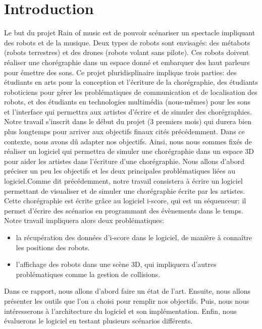 \section{Introduction}

Le but du projet Rain of music est de pouvoir scénariser un spectacle impliquant des robots et de la musique. Deux types de robots sont envisagés: des métabots (robots terrestres) et des drones (robots volant sans pilote). Ces robots doivent réaliser une chorégraphie dans un espace donné et embarquer des haut parleurs pour émettre des sons. Ce projet pluridisplinaire implique trois parties: des étudiants en arts pour la conception et l'écriture de la chorégraphie, des étudiants roboticiens pour gérer les problématiques de communication et de localisation des robots, et des étudiants en technologies multimédia (nous-mêmes) pour les sons et l'interface qui permettra aux artistes d'écrire et de simuler des chorégraphies. \\

Notre travail s'inscrit dans le début du projet (3 premiers mois) qui durera bien plus longtemps pour arriver aux objectifs finaux cités précédemment. Dans ce contexte, nous avons dû adapter nos objectifs. Ainsi, nous nous sommes fixés de réaliser un logiciel qui permettra de simuler une chorégraphie dans un espace 3D pour aider les artistes dans l'écriture d'une chorégraphie. Nous allons d'abord préciser un peu les objectifs et les deux principales problématiques liées au logiciel.Comme dit précédemment, notre travail consistera à écrire un logiciel permettant de visualiser et de simuler une chorégraphie écrite par les artistes. Cette chorégraphie est écrite grâce au logiciel i-score, qui est un séquenceur: il permet d'écrire des scénarios en programmant des évènements dans le temps. Notre travail impliquera alors deux problématiques: 
\begin{itemize}
\item la récupération des données d'i-score dans le logiciel, de manière à connaître les positions des robots.
\item l'affichage des robots dans une scène 3D, qui impliquera d'autres problématiques comme la gestion de collisions.
\end{itemize} 

Dans ce rapport, nous allons d'abord faire un état de l'art. Ensuite, nous allons présenter les outils que l'on a choisi pour remplir nos objectifs. Puis, nous nous intéresserons à l'architecture du logiciel et son implémentation. Enfin, nous évaluerons le logiciel en testant plusieurs scénarios différents. \\